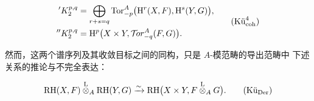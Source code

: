 \begin{equation}
\begin{aligned}
{}'K_2^{p,q}
  &=\bigoplus_{r+s=q}
    \operatorname{Tor}_{-p}^{A}
    \bigl(\mathrm H^r(X,F),\mathrm H^s(Y,G)\bigr), \\
{}''K_2^{p,q}
  &=\mathrm H^p\bigl(X\times Y,\mathcal T\!or_{-q}^{A}(F,G)\bigr).
\end{aligned}
\tag{$\text{Kü}_{\mathrm{coh}}^{4}$}
\end{equation}

然而，这两个谱序列及其收敛目标之间的同构，只是 $A$-模范畴的导出范畴中
下述关系的推论与不完全表达：

\begin{equation}
\mathrm{RH}(X,F)\overset{\mathrm L}{\otimes}_A\mathrm{RH}(Y,G)
\xrightarrow{\sim}
\mathrm{RH}\bigl(X\times Y,F\overset{\mathrm L}{\otimes}_A G\bigr).
\tag{$\text{Kü}_{\mathrm{Der}}$}
\end{equation}
